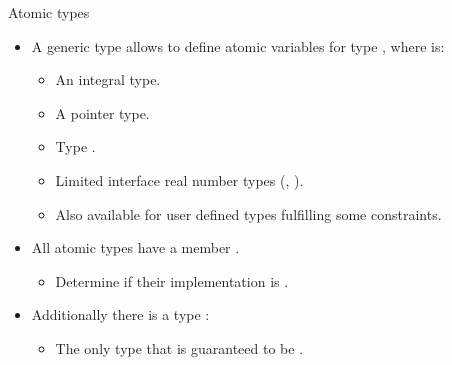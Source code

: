 \begin{frame}[t]{Atomic types}
\begin{itemize}
  \item A generic type  allows to define atomic variables for type , where  is:
    \begin{itemize}
      \item An integral type.
      \item A pointer type.
      \item Type .
      \item Limited interface real number types (, ).
      \item Also available for user defined types fulfilling some constraints.
    \end{itemize}

  \item All atomic types have a member .
    \begin{itemize}
      \item Determine if their implementation is .
    \end{itemize}

  \item Additionally there is a type :
    \begin{itemize}
      \item The only type that is guaranteed to be .
    \end{itemize}
\end{itemize}
\end{frame}

